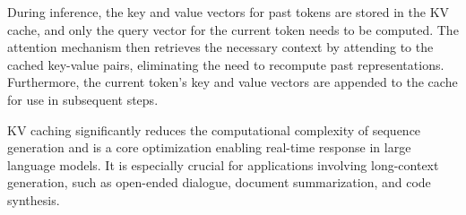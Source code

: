 During inference, the key and value vectors for past tokens are stored in the KV cache, and only the query vector for the current token needs to be computed. The attention mechanism then retrieves the necessary context by attending to the cached key-value pairs, eliminating the need to recompute past representations. Furthermore, the current token's key and value vectors are appended to the cache for use in subsequent steps.

KV caching significantly reduces the computational complexity of sequence generation and is a core optimization enabling real-time response in large language models. It is especially crucial for applications involving long-context generation, such as open-ended dialogue, document summarization, and code synthesis.

